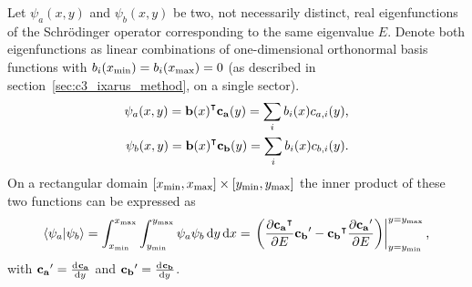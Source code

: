 \begin{theorem}\label{the:c3_dot_product}
  Let $\psi_a(x, y)$ and $\psi_b(x, y)$ be two, not necessarily distinct, real eigenfunctions of the Schrödinger operator corresponding to the same eigenvalue $E$. Denote both eigenfunctions as linear combinations of one-dimensional orthonormal basis functions with $b_i({x_{\text{min}}}) = b_i({x_{\text{max}}}) = 0$ (as described in section~\ref{sec:c3_ixarus_method}, on a single sector).
  \begin{align*}
    \psi_a(x, y) = {\vb{b}(x)}^\intercal \vb{c_a}(y) = \sum_i b_i(x) c_{a, i}(y) \text{,}\\
    \psi_b(x, y) = {\vb{b}(x)}^\intercal \vb{c_b}(y) = \sum_i b_i(x) c_{b, i}(y) \text{.}
  \end{align*}
  On a rectangular domain $[{x_{\text{min}}}, {x_{\text{max}}}] \times [{y_{\text{min}}}, {y_{\text{max}}}]$ the inner product of these two functions can be expressed as
  $$
    \bra{\psi_a}\ket{\psi_b} = \int_{x_{\text{min}}}^{x_{\text{max}}} \int_{y_{\text{min}}}^{y_{\text{max}}} \psi_a\psi_b \, \dd y \, \dd x = \left. \left(\pdv{{\vb{c_a}}^\intercal}{E} \vb{c_b}' - {\vb{c_b}}^\intercal\pdv{\vb{c_a}'}{E} \right) \right|_{y={y_{\text{min}}}}^{y={y_{\text{max}}}} \text{,}
  $$
  with $\vb{c_a}' = \dv[]{\vb{c_a}}{y}$ and $\vb{c_b}' = \dv[]{\vb{c_b}}{y}$.
\end{theorem}
